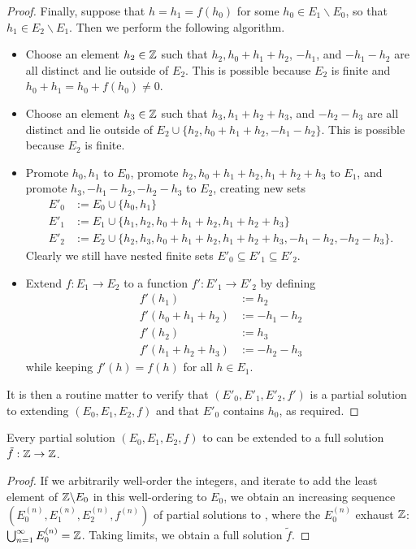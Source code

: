 \begin{proof}
Finally, suppose that $h = h_1 = f(h_0)$ for some $h_0 \in E_1 \backslash E_0$, so that $h_1 \in E_2 \backslash E_1$.  Then we perform the following algorithm.
\begin{itemize}
  \item Choose an element $h_2 \in \mathbb{Z}$ such that $h_2, h_0+h_1+h_2$, $-h_1$, and $-h_1-h_2$ are all distinct and lie outside of $E_2$.  This is possible because $E_2$ is finite and $h_0+h_1 = h_0+f(h_0) \neq 0$.
  \item Choose an element $h_3 \in \mathbb{Z}$ such that $h_3, h_1+h_2+h_3$, and $-h_2-h_3$ are all distinct and lie outside of $E_2 \cup \{h_2, h_0+h_1+h_2,-h_1-h_2\}$.  This is possible because $E_2$ is finite.
  \item Promote $h_0, h_1$ to $E_0$, promote $h_2, h_0+h_1+h_2, h_1+h_2+h_3$ to $E_1$, and promote $h_3, -h_1-h_2,-h_2-h_3$ to $E_2$, creating new sets
\begin{align*}
  E'_0 &:= E_0 \cup \{h_0, h_1 \}\\
  E'_1 &:= E_1 \cup \{h_1, h_2, h_0+h_1+h_2, h_1+h_2+h_3 \}\\
  E'_2 &:= E_2 \cup \{h_2, h_3, h_0+h_1+h_2, h_1+h_2+h_3, -h_1-h_2, -h_2-h_3\}.
\end{align*}
Clearly we still have nested finite sets $E'_0 \subseteq E'_1 \subseteq E'_2$.
\item Extend $f : E_1 \to E_2$ to a function $f': E'_1 \to E'_2$ by defining
\begin{align*}
  f'(h_1) &:= h_2 \\
  f'(h_0+h_1+h_2) &:= -h_1-h_2 \\
  f'(h_2) &:= h_3 \\
  f'(h_1+h_2+h_3) &:= -h_2-h_3
\end{align*}
while keeping $f'(h)=f(h)$ for all $h \in E_1$.
\end{itemize}
It is then a routine matter to verify that $(E'_0,E'_1,E'_2,f')$ is a partial solution to  extending $(E_0,E_1,E_2,f)$ and that $E'_0$ contains $h_0$, as required.
\end{proof}

\begin{corollary} \label{extend} Every partial solution $(E_0,E_1,E_2,f)$ to  can be extended to a full solution $\tilde f: \mathbb{Z} \to \mathbb{Z}$.
\end{corollary}

\begin{proof}
  If we arbitrarily well-order the integers, and iterate  to add the least element of $\mathbb{Z} \backslash E_0$ in this well-ordering to $E_0$, we obtain an increasing sequence $(E^{(n)}_0, E^{(n)}_1, E^{(n)}_2, f^{(n)})$ of partial solutions to , where the $E^{(n)}_0$ exhaust $\mathbb{Z}$: $\bigcup_{n=1}^\infty E^{(n)}_0 = \mathbb{Z}$.  Taking limits, we obtain a full solution $\tilde f$.
\end{proof}

